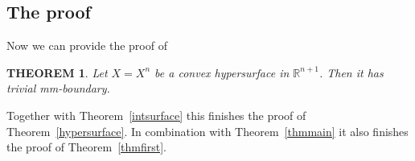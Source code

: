 \documentclass[12pt,leqno]{amsart}
\numberwithin{equation}{section}
\newtheorem{thm}{THEOREM}[section]
\theoremstyle{definition}
\theoremstyle{remark}
\newcommand{\tref}[1]{Theorem~\ref{#1}}
\newcommand{\R}{\mathbb{R}}
\begin{document}
\subsection{The proof} Now we can provide the proof of
\begin{thm} \label{thmconv}
Let $X=X^n$ be a convex hypersurface in $\R^{n+1}$.  Then it has trivial mm-boundary.

\end{thm}
Together with \tref{intsurface} this finishes the proof of \tref{hypersurface}. In combination with \tref{thmmain} it also finishes the proof of \tref{thmfirst}.
\end{document}
